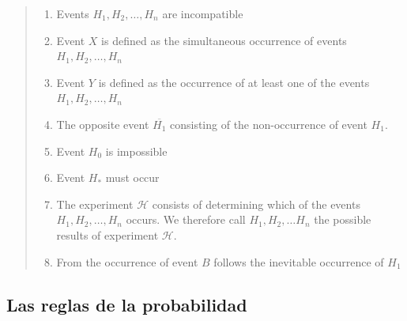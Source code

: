 \documentclass[a4paper,11pt]{book}
\theoremstyle{definition}
\begin{document}
\begin{quotation}
\begin{paracol}{2}
\begin{enumerate}
    \item Events $H_1, H_2, \dots, H_n$ are incompatible

    \item Event $X$ is defined as the simultaneous occurrence of events $H_1, H_2, \dots, H_n$

    \item Event $Y$ is defined as the occurrence of at least one of the events $H_1, H_2, \dots, H_n$

    \item The opposite event $\overline{H_1}$ consisting of the non-occurrence of event $H_1$.

    \item Event $H_0$ is impossible

    \item Event $H_{*}$ must occur

    \item The experiment $\mathcal{H}$ consists of determining which of the events $H_1, H_2, \dots, H_n $ occurs. We therefore call $H_1, H_2, \dots H_n$ the possible results of experiment $\mathcal{H}$.

    \item From the occurrence of event $B$ follows the inevitable occurrence of $H_1$
  \end{enumerate}

  \end{paracol}

\end{quotation}
%

\subsection{Las reglas de la probabilidad}
\end{document}
